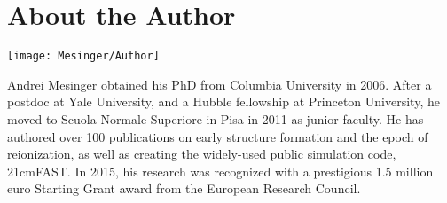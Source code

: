 \chapter*{About the Author}


\texttt{[image: Mesinger/Author]}

Andrei Mesinger obtained his PhD from Columbia University in 2006.  After a postdoc at Yale University, and a Hubble fellowship at Princeton University, he moved to Scuola Normale Superiore in Pisa in 2011 as junior faculty.  He has authored over 100 publications on early structure formation and the epoch of reionization, as well as creating the widely-used public simulation code, 21cmFAST.  In 2015, his research was recognized with a prestigious 1.5 million euro Starting Grant award from the European Research Council.
